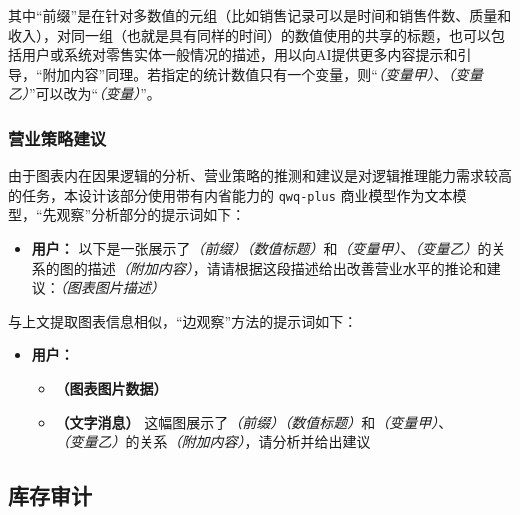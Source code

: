 其中“前缀”是在针对多数值的元组（比如销售记录可以是时间和销售件数、质量和收入），对同一组（也就是具有同样的时间）的数值使用的共享的标题，也可以包括用户或系统对零售实体一般情况的描述，用以向AI提供更多内容提示和引导，“附加内容”同理。若指定的统计数值只有一个变量，则“\textit{（变量甲）}、\textit{（变量乙）}”可以改为“\textit{（变量）}”。

\subsubsection{营业策略建议}

由于图表内在因果逻辑的分析、营业策略的推测和建议是对逻辑推理能力需求较高的任务，本设计该部分使用带有内省能力的 \verb|qwq-plus| 商业模型作为文本模型，“先观察”分析部分的提示词如下：

\begin{itemize}
    \item[] \textbf{用户：} 以下是一张展示了\textit{（前缀）}\textit{（数值标题）}和\textit{（变量甲）}、\textit{（变量乙）}的关系的图的描述\textit{（附加内容）}，请请根据这段描述给出改善营业水平的推论和建议：\textit{（图表图片描述）}
\end{itemize}

与上文提取图表信息相似，“边观察”方法的提示词如下：

\begin{itemize}
    \item[] \textbf{用户：}
    \begin{itemize}
        \item[] \textbf{（图表图片数据）}
        \item[] \textbf{（文字消息）} 这幅图展示了\textit{（前缀）}\textit{（数值标题）}和\textit{（变量甲）}、\textit{（变量乙）}的关系\textit{（附加内容）}，请分析并给出建议
    \end{itemize}
\end{itemize}

\subsection{库存审计}

